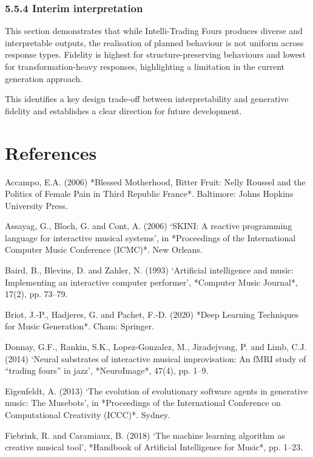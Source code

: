 \subsubsection{5.5.4 Interim
interpretation}\label{interim-interpretation-2}

This section demonstrates that while Intelli-Trading Fours produces
diverse and interpretable outputs, the realisation of planned behaviour
is not uniform across response types. Fidelity is highest for
structure-preserving behaviours and lowest for transformation-heavy
responses, highlighting a limitation in the current generation approach.

This identifies a key design trade-off between interpretability and
generative fidelity and establishes a clear direction for future
development.

\section{References}\label{references}

Accampo, E.A. (2006) *Blessed Motherhood, Bitter Fruit: Nelly Roussel
and the Politics of Female Pain in Third Republic France*. Baltimore:
Johns Hopkins University Press.

Assayag, G., Bloch, G. and Cont, A. (2006) `SKINI: A reactive
programming language for interactive musical systems', in *Proceedings
of the International Computer Music Conference (ICMC)*. New Orleans.

Baird, B., Blevins, D. and Zahler, N. (1993) `Artificial intelligence
and music: Implementing an interactive computer performer', *Computer
Music Journal*, 17(2), pp. 73--79.

Briot, J.-P., Hadjeres, G. and Pachet, F.-D. (2020) *Deep Learning
Techniques for Music Generation*. Cham: Springer.

Donnay, G.F., Rankin, S.K., Lopez-Gonzalez, M., Jiradejvong, P. and
Limb, C.J. (2014) `Neural substrates of interactive musical
improvisation: An fMRI study of ``trading fours'' in jazz',
*NeuroImage*, 47(4), pp. 1--9.

Eigenfeldt, A. (2013) `The evolution of evolutionary software agents in
generative music: The Musebots', in *Proceedings of the International
Conference on Computational Creativity (ICCC)*. Sydney.

Fiebrink, R. and Caramiaux, B. (2018) `The machine learning algorithm as
creative musical tool', *Handbook of Artificial Intelligence for Music*,
pp. 1--23.

